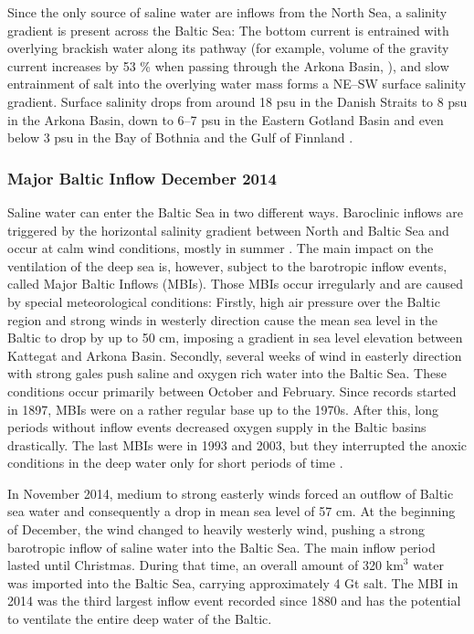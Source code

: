 Since the only source of saline water are inflows from the North Sea, a salinity gradient is present across the Baltic Sea: The bottom current is entrained with overlying brackish water along its pathway (for example, volume of the gravity current increases by 53 \% when passing through the Arkona Basin, \citep[see][]{reissmann2009}), and slow entrainment of salt into the overlying water mass forms a NE--SW surface salinity gradient. Surface salinity drops from around 18 psu in the Danish Straits to 8 psu in the Arkona Basin, down to 6--7 psu in the Eastern Gotland Basin and even below 3 psu in the Bay of Bothnia and the Gulf of Finnland \citep[][]{balticsea}.

\subsubsection{Major Baltic Inflow December 2014}

Saline water can enter the Baltic Sea in two different ways. Baroclinic inflows are triggered by the horizontal salinity gradient between North and Baltic Sea and occur at calm wind conditions, mostly in summer \citep[][]{reissmann2009}. The main impact on the ventilation of the deep sea is, however, subject to the barotropic inflow events, called Major Baltic Inflows (MBIs). Those MBIs occur irregularly and are caused by special meteorological conditions: Firstly, high air pressure over the Baltic region and strong winds in westerly direction cause the mean sea level in the Baltic to drop by up to 50 cm, imposing a gradient in sea level elevation between Kattegat and Arkona Basin. Secondly, several weeks of wind in easterly direction with strong gales \citep[][]{balticsea, reissmann2009, mohrholz2015} push saline and oxygen rich water into the Baltic Sea.
These conditions occur primarily between October and February. Since records started in 1897, MBIs were on a rather regular base up to the 1970s. After this, long periods without inflow events decreased oxygen supply in the Baltic basins drastically. The last MBIs were in 1993 and 2003, but they interrupted the anoxic conditions in the deep water only for short periods of time \citep[][]{schinke1998, mohrholz2015}.

In November 2014, medium to strong easterly winds forced an outflow of Baltic sea water and consequently a drop in mean sea level of 57 cm. At the beginning of December, the wind changed to heavily westerly wind, pushing a strong barotropic inflow of saline water into the Baltic Sea. The main inflow period lasted until Christmas. During that time, an overall amount of 320 $\text{km}^3$ water was imported into the Baltic Sea, carrying approximately 4 Gt salt. The MBI in 2014 was the third largest inflow event recorded since 1880 and has the potential to ventilate the entire deep water of the Baltic. 

